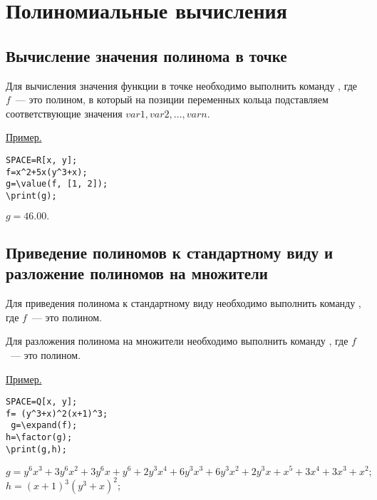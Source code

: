 \chapter{Полиномиальные вычисления}

\section{Вычисление значения полинома в точке}
Для вычисления значения функции в точке необходимо выполнить команду  
, 
где $f$~--- это полином,  в который на позиции переменных кольца подставляем соответствующие значения $var1, var2, \ldots, varn$. 

\underline{Пример. }

\vspace*{-2mm}
\begin{verbatim}
SPACE=R[x, y]; 
f=x^2+5x(y^3+x);
g=\value(f, [1, 2]); 
\print(g);
\end{verbatim}

{$g = 46. 00.$}

\section{Приведение полиномов к стандартному виду и разложение полиномов на множители}

Для приведения полинома к стандартному виду  необходимо выполнить команду  
, где $f$~--- это полином.

Для разложения полинома на множители необходимо выполнить команду  
, где $f$~--- это полином.


\underline{Пример. }

\vspace*{-2mm}
\begin{verbatim}
SPACE=Q[x, y]; 
f= (y^3+x)^2(x+1)^3;
 g=\expand(f);
h=\factor(g);
\print(g,h);
\end{verbatim}

{$g = y^6x^3+3y^6x^2+3y^6x+y^6+2y^3x^4+6y^3x^3+6y^3x^2+2y^3x+x^5+3x^4+3x^3+x^2;$\\
\hspace*{4mm} $h=(x+1)^3(y^3+x)^2;$}

